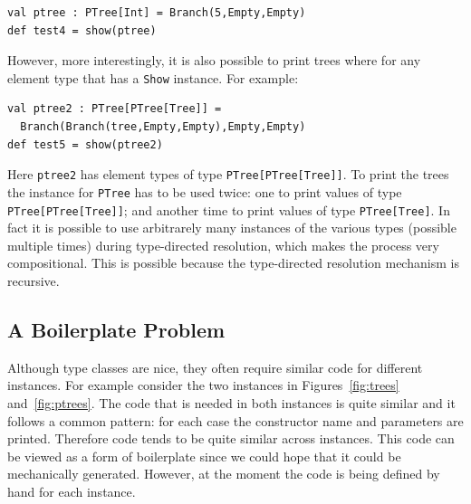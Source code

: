 \documentclass[preprint]{sigplanconf}
\begin{document}
\begin{lstlisting}
val ptree : PTree[Int] = Branch(5,Empty,Empty)
def test4 = show(ptree)
\end{lstlisting}

However, more interestingly, it is also possible to print trees where
for any element type that has a \lstinline{Show} instance. For example:

\begin{lstlisting}
val ptree2 : PTree[PTree[Tree]] =
  Branch(Branch(tree,Empty,Empty),Empty,Empty)
def test5 = show(ptree2)
\end{lstlisting}

Here \lstinline{ptree2} has element types of type
\lstinline{PTree[PTree[Tree]]}. To print the trees the instance for
\lstinline{PTree} has to be used twice: one to print values of type
\lstinline{PTree[PTree[Tree]]}; and another time to print values of
type \lstinline{PTree[Tree]}. In fact it is possible to use
arbitrarely many instances of the various types (possible multiple
times) during type-directed resolution, which makes the process very
compositional. This is possible because the type-directed resolution
mechanism is recursive.

\subsection{A Boilerplate Problem}

Although type classes are nice, they often require similar code for
different instances. For example consider the two instances
in Figures~\ref{fig:trees} and~\ref{fig:ptrees}. The code that is
needed in both instances is quite similar and it follows a common
pattern: for each case the constructor name and parameters are
printed. Therefore code tends to be quite similar across instances. This
code can be viewed as a form of boilerplate since we could hope that
it could be mechanically generated. However, at the moment the code
is being defined by hand for each instance.

\end{document}
